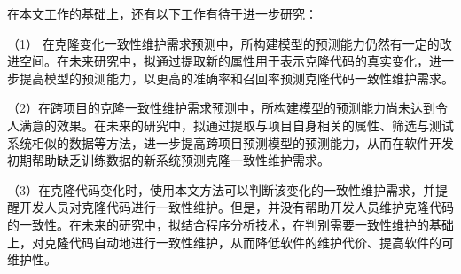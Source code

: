 在本文工作的基础上，还有以下工作有待于进一步研究：

（1） 在克隆变化一致性维护需求预测中，所构建模型的预测能力仍然有一定的改进空间。在未来研究中，拟通过提取新的属性用于表示克隆代码的真实变化，进一步提高模型的预测能力，以更高的准确率和召回率预测克隆代码一致性维护需求。

（2）在跨项目的克隆一致性维护需求预测中，所构建模型的预测能力尚未达到令人满意的效果。在未来的研究中，拟通过提取与项目自身相关的属性、筛选与测试系统相似的数据等方法，进一步提高跨项目预测模型的预测能力，从而在软件开发初期帮助缺乏训练数据的新系统预测克隆一致性维护需求。

（3）在克隆代码变化时，使用本文方法可以判断该变化的一致性维护需求，并提醒开发人员对克隆代码进行一致性维护。但是，并没有帮助开发人员维护克隆代码的一致性。在未来的研究中，拟结合程序分析技术，在判别需要一致性维护的基础上，对克隆代码自动地进行一致性维护，从而降低软件的维护代价、提高软件的可维护性。%